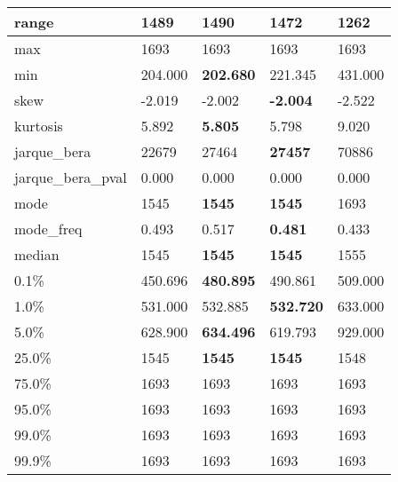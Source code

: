 \begin{table}[H]
\begin{tabular}{|l|m{10em}|m{10em}|m{10em}|m{10em}|}
\hline range & 1489 & \bfseries 1490 & 1472 & \cellcolor[rgb]{0.9, 0.54, 0.52} 1262 \\
\hline max & 1693 & 1693 & 1693 & 1693 \\
\hline min & 204.000 & \bfseries 202.680 & 221.345 & \cellcolor[rgb]{0.9, 0.54, 0.52} 431.000 \\
\hline skew & -2.019 & -2.002 & \bfseries -2.004 & \cellcolor[rgb]{0.9, 0.54, 0.52} -2.522 \\
\hline kurtosis & 5.892 & \bfseries 5.805 & 5.798 & \cellcolor[rgb]{0.9, 0.54, 0.52} 9.020 \\
\hline jarque\_bera & 22679 & 27464 & \bfseries 27457 & \cellcolor[rgb]{0.9, 0.54, 0.52} 70886 \\
\hline jarque\_bera\_pval & 0.000 & 0.000 & 0.000 & 0.000 \\
\hline mode & 1545 & \bfseries 1545 & \bfseries 1545 & \cellcolor[rgb]{0.9, 0.54, 0.52} 1693 \\
\hline mode\_freq & 0.493 & 0.517 & \bfseries 0.481 & \cellcolor[rgb]{0.9, 0.54, 0.52} 0.433 \\
\hline median & 1545 & \bfseries 1545 & \bfseries 1545 & \cellcolor[rgb]{0.9, 0.54, 0.52} 1555 \\
\hline 0.1\% & 450.696 & \bfseries 480.895 & 490.861 & \cellcolor[rgb]{0.9, 0.54, 0.52} 509.000 \\
\hline 1.0\% & 531.000 & 532.885 & \bfseries 532.720 & \cellcolor[rgb]{0.9, 0.54, 0.52} 633.000 \\
\hline 5.0\% & 628.900 & \bfseries 634.496 & 619.793 & \cellcolor[rgb]{0.9, 0.54, 0.52} 929.000 \\
\hline 25.0\% & 1545 & \bfseries 1545 & \bfseries 1545 & \cellcolor[rgb]{0.9, 0.54, 0.52} 1548 \\
\hline 75.0\% & 1693 & 1693 & 1693 & 1693 \\
\hline 95.0\% & 1693 & 1693 & 1693 & 1693 \\
\hline 99.0\% & 1693 & 1693 & 1693 & 1693 \\
\hline 99.9\% & 1693 & 1693 & 1693 & 1693 \\
\hline
\end{tabular}
\end{table}
